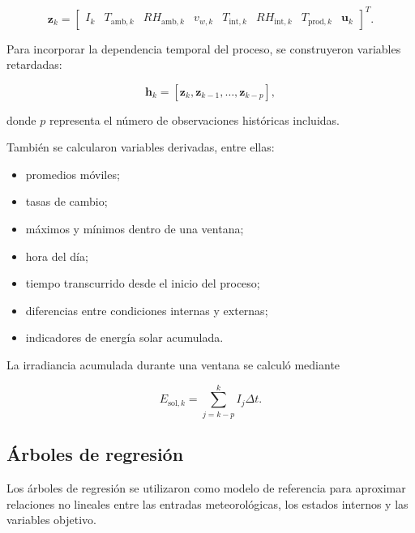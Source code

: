 \begin{equation}
\mathbf{z}_k
=
\begin{bmatrix}
I_k &
T_{\mathrm{amb},k} &
RH_{\mathrm{amb},k} &
v_{w,k} &
T_{\mathrm{int},k} &
RH_{\mathrm{int},k} &
T_{\mathrm{prod},k} &
\mathbf{u}_k
\end{bmatrix}^{T}.
\label{eq:vector_entrada_ml}
\end{equation}

Para incorporar la dependencia temporal del proceso, se construyeron variables retardadas:

\begin{equation}
\mathbf{h}_{k}
=
\left[
\mathbf{z}_{k},
\mathbf{z}_{k-1},
\ldots,
\mathbf{z}_{k-p}
\right],
\label{eq:ventana_temporal}
\end{equation}

donde $p$ representa el número de observaciones históricas incluidas.

También se calcularon variables derivadas, entre ellas:

\begin{itemize}
    \item promedios móviles;
    \item tasas de cambio;
    \item máximos y mínimos dentro de una ventana;
    \item hora del día;
    \item tiempo transcurrido desde el inicio del proceso;
    \item diferencias entre condiciones internas y externas;
    \item indicadores de energía solar acumulada.
\end{itemize}

La irradiancia acumulada durante una ventana se calculó mediante

\begin{equation}
E_{\mathrm{sol},k}
=
\sum_{j=k-p}^{k}
I_j\Delta t.
\label{eq:irradiancia_acumulada_ml}
\end{equation}

\subsection{Árboles de regresión}
\label{subsec:arboles_regresion_metodologia}

Los árboles de regresión se utilizaron como modelo de referencia para aproximar relaciones no lineales entre las entradas meteorológicas, los estados internos y las variables objetivo.

